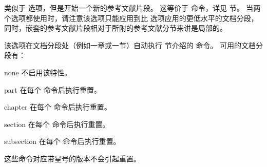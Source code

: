 \begin{optionlist}


类似于  选项，但是开始一个新的参考文献片段。
这等价于  命令，详见  节。
当两个选项都使用时，请注意该选项只能应用到比  选项应用的更低水平的文档分段，
同时，嵌套的参考文献片段相对于所附的参考文献分节来讲是局部的。



该选项在文档分段处（例如一章或一节）自动执行  节介绍的  命令。
可用的文档分段有：

\begin{valuelist}
\item[none] %
不启用该特性。
\item[part] %
在每个   命令后执行重置。
\item[chapter] %
在每个   命令后执行重置。
\item[section] %
在每个   命令后执行重置。
\item[subsection] %
在每个   命令后执行重置。
\end{valuelist}
%
这些命令对应带星号的版本不会引起重置。




\end{optionlist}
